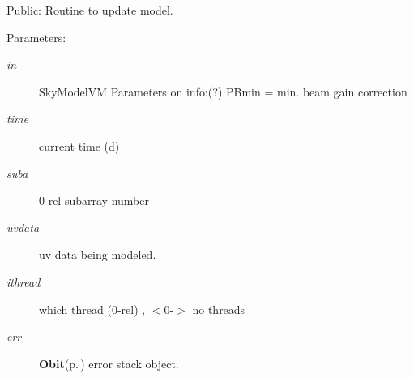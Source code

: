 Public: Routine to update model. 

\begin{Desc}
\item[Parameters:]
\begin{description}
\item[{\em in}]Sky\-Model\-VM Parameters on info:(?) PBmin = min. beam gain correction \item[{\em time}]current time (d) \item[{\em suba}]0-rel subarray number \item[{\em uvdata}]uv data being modeled. \item[{\em ithread}]which thread (0-rel) , $<$0-$>$ no threads \item[{\em err}]{\bf Obit}{\rm (p.\,\pageref{structObit})} error stack object. \end{description}
\end{Desc}
